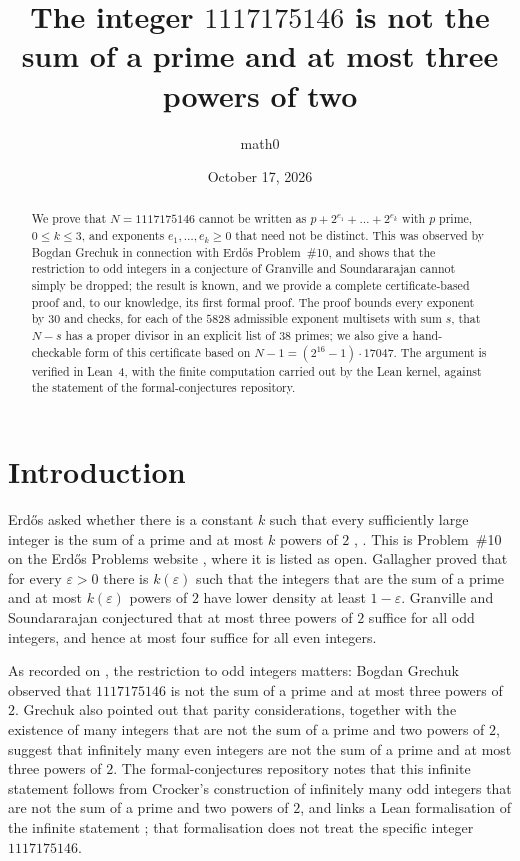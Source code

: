 \documentclass[11pt]{amsart}
\title[$1117175146$ is not a prime plus at most three powers of two]{The integer $1117175146$ is not the sum of a prime and at most three powers of two}
\author{math0}
\date{October 17, 2026}
\theoremstyle{plain}
\theoremstyle{definition}
\begin{document}
\begin{abstract}
We prove that $N=1117175146$ cannot be written as $p+2^{e_1}+\dots+2^{e_k}$ with $p$ prime, $0\le k\le 3$, and exponents $e_1,\dots,e_k\ge 0$ that need not be distinct.
This was observed by Bogdan Grechuk in connection with Erd\H{o}s Problem~\#10, and shows that the restriction to odd integers in a conjecture of Granville and Soundararajan cannot simply be dropped; the result is known, and we provide a complete certificate-based proof and, to our knowledge, its first formal proof.
The proof bounds every exponent by $30$ and checks, for each of the $5828$ admissible exponent multisets with sum $s$, that $N-s$ has a proper divisor in an explicit list of $38$ primes; we also give a hand-checkable form of this certificate based on $N-1=(2^{16}-1)\cdot 17047$.
The argument is verified in Lean~4, with the finite computation carried out by the Lean kernel, against the statement  of the formal-conjectures repository.
\end{abstract}
\maketitle

\section{Introduction}

Erd\H{o}s asked whether there is a constant $k$ such that every sufficiently large integer is the sum of a prime and at most $k$ powers of $2$ \cite[p.~96]{Er80}, \cite[p.~28]{ErGr80}.
This is Problem~\#10 on the Erd\H{o}s Problems website \cite{EP10}, where it is listed as open.
Gallagher \cite{Ga75} proved that for every $\varepsilon>0$ there is $k(\varepsilon)$ such that the integers that are the sum of a prime and at most $k(\varepsilon)$ powers of $2$ have lower density at least $1-\varepsilon$.
Granville and Soundararajan \cite{GrSo98} conjectured that at most three powers of $2$ suffice for all odd integers, and hence at most four suffice for all even integers.

As recorded on \cite{EP10}, the restriction to odd integers matters: Bogdan Grechuk observed that $1117175146$ is not the sum of a prime and at most three powers of $2$.
Grechuk also pointed out that parity considerations, together with the existence of many integers that are not the sum of a prime and two powers of $2$, suggest that infinitely many even integers are not the sum of a prime and at most three powers of $2$.
The formal-conjectures repository \cite{FC} notes that this infinite statement follows from Crocker's construction \cite{Cr71} of infinitely many odd integers that are not the sum of a prime and two powers of $2$, and links a Lean formalisation of the infinite statement \cite{Da}; that formalisation does not treat the specific integer $1117175146$.
\end{document}
